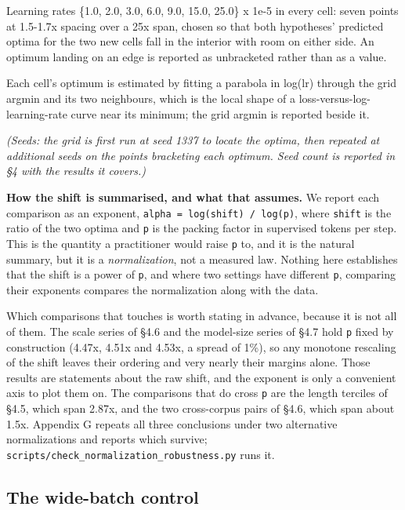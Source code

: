 \documentclass[11pt]{article}
\begin{document}
Learning rates \{1.0, 2.0, 3.0, 6.0, 9.0, 15.0, 25.0\} x 1e-5 in every cell: seven points at 1.5-1.7x spacing over a 25x span, chosen so that both hypotheses' predicted optima for the two new cells fall in the interior with room on either side. An optimum landing on an edge is reported as unbracketed rather than as a value.

Each cell's optimum is estimated by fitting a parabola in log(lr) through the grid argmin and its two neighbours, which is the local shape of a loss-versus-log-learning-rate curve near its minimum; the grid argmin is reported beside it.

\emph{(Seeds: the grid is first run at seed 1337 to locate the optima, then repeated at additional seeds on the points bracketing each optimum. Seed count is reported in \S{}4 with the results it covers.)}

\textbf{How the shift is summarised, and what that assumes.} We report each comparison as an exponent, \texttt{alpha = log(shift) /\allowbreak{} log(p)}, where \texttt{shift} is the ratio of the two optima and \texttt{p} is the packing factor in supervised tokens per step. This is the quantity a practitioner would raise \texttt{p} to, and it is the natural summary, but it is a \emph{normalization}, not a measured law. Nothing here establishes that the shift is a power of \texttt{p}, and where two settings have different \texttt{p}, comparing their exponents compares the normalization along with the data.

Which comparisons that touches is worth stating in advance, because it is not all of them. The scale series of \S{}4.6 and the model-size series of \S{}4.7 hold \texttt{p} fixed by construction (4.47x, 4.51x and 4.53x, a spread of 1\%), so any monotone rescaling of the shift leaves their ordering and very nearly their margins alone. Those results are statements about the raw shift, and the exponent is only a convenient axis to plot them on. The comparisons that do cross \texttt{p} are the length terciles of \S{}4.5, which span 2.87x, and the two cross-corpus pairs of \S{}4.6, which span about 1.5x. Appendix G repeats all three conclusions under two alternative normalizations and reports which survive; \texttt{scripts/\allowbreak{}check\_\allowbreak{}normalization\_\allowbreak{}robustness.py} runs it.

\subsection{The wide-batch control}
\end{document}
